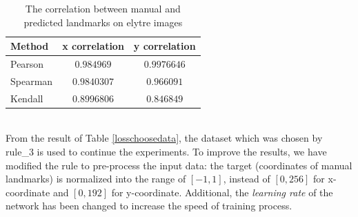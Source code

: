 \begin{table}[h!]
	\centering
	\begin{tabular}{l c c}
		Method & x correlation & y correlation \\ \hline
		Pearson & $0.984969$ & $0.9976646$ \\ \hline
		Spearman & $0.9840307$ & $0.966091$ \\ \hline
		Kendall & $0.8996806$ & $0.846849$ \\ \hline
	\end{tabular}
	\caption{The correlation between manual and predicted landmarks on elytre images}
	\label{elytre}
\end{table}~\\
From the result of Table \ref{losschoosedata}, the dataset which was chosen by rule\_3 is used to continue the experiments. To improve the results, we have modified the rule to pre-process the input data: the target (coordinates of manual landmarks) is normalized into the range of $[-1,1]$, instead of $[0,256]$ for x-coordinate and $[0,192]$ for y-coordinate. Additional, the \textit{learning rate} of the network has been changed to increase the speed of training process.

